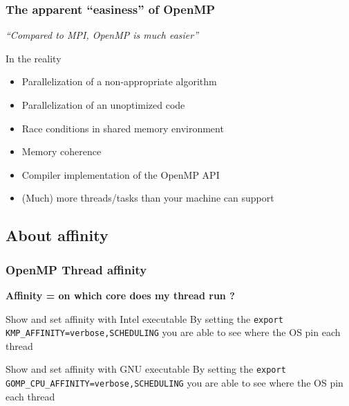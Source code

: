 \begin{frame}
\frametitle{The apparent ``easiness'' of OpenMP}

\begin{block}{}
\textit{``Compared to MPI, OpenMP is much easier''}
\end{block}

\begin{exampleblock}{In the reality}
\begin{itemize}
\item{Parallelization of a non-appropriate algorithm}
\item{Parallelization of an unoptimized code}
\item{Race conditions in shared memory environment}
\item{Memory coherence}
\item{Compiler implementation of the OpenMP API}
\item{(Much) more threads/tasks than your machine can support}
\end{itemize}
\end{exampleblock}

\end{frame}


\subsection{About affinity}


\begin{frame}[fragile]
\frametitle{OpenMP Thread affinity}

\textbf{Affinity = on which core does my thread run ?}

\begin{block}{Show and set affinity with Intel executable}
By setting the \verb+export KMP_AFFINITY=verbose,SCHEDULING+ you are able to see where the OS pin each thread
\end{block}
\begin{block}{Show and set affinity with GNU executable}
By setting the \verb+export GOMP_CPU_AFFINITY=verbose,SCHEDULING+ you are able to see where the OS pin each thread
\end{block}
\end{frame}




